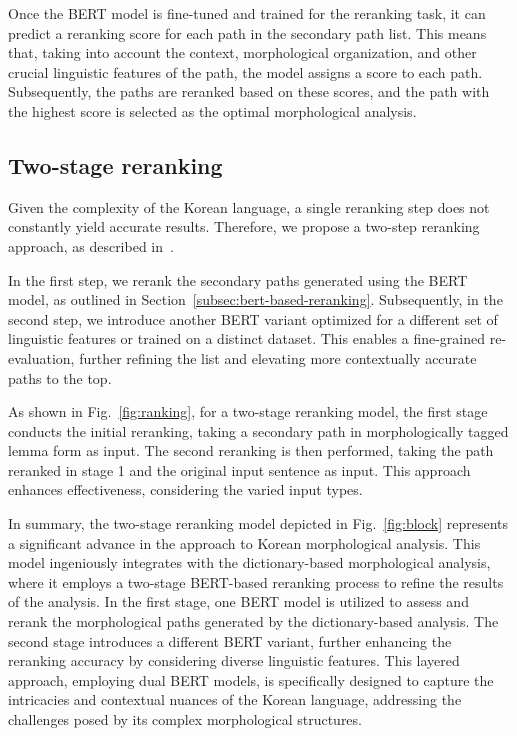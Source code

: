\documentclass[AMS,STIX2COL]{WileyNJD-v2}
\begin{document}
    Once the BERT model is fine-tuned and trained for the reranking task, it can predict a reranking score for each path in the secondary path list.
    This means that, taking into account the context, morphological organization, and other crucial linguistic features of the path, the model assigns a score to each path.
    Subsequently, the paths are reranked based on these scores, and the path with the highest score is selected as the optimal morphological analysis.

    \subsection{Two-stage reranking}\label{subsec:two-stage-reranking}

    Given the complexity of the Korean language, a single reranking step does not constantly yield accurate results.
    Therefore, we propose a two-step reranking approach, as described in~\cite{Nogueira2019}.

    In the first step, we rerank the secondary paths generated using the BERT model, as outlined in Section~\ref{subsec:bert-based-reranking}.
    Subsequently, in the second step, we introduce another BERT variant optimized for a different set of linguistic features or trained on a distinct dataset.
    This enables a fine-grained re-evaluation, further refining the list and elevating more contextually accurate paths to the top.

    As shown in Fig.~\ref{fig:ranking}, for a two-stage reranking model, the first stage conducts the initial reranking, taking a secondary path in morphologically tagged lemma form as input.
    The second reranking is then performed, taking the path reranked in stage 1 and the original input sentence as input.
    This approach enhances effectiveness, considering the varied input types.

    In summary, the two-stage reranking model depicted in Fig.~\ref{fig:block} represents a significant advance in the approach to Korean morphological analysis.
    This model ingeniously integrates with the dictionary-based morphological analysis, where it employs a two-stage BERT-based reranking process to refine the results of the analysis.
    In the first stage, one BERT model is utilized to assess and rerank the morphological paths generated by the dictionary-based analysis.
    The second stage introduces a different BERT variant, further enhancing the reranking accuracy by considering diverse linguistic features.
    This layered approach, employing dual BERT models, is specifically designed to capture the intricacies and contextual nuances of the Korean language, addressing the challenges posed by its complex morphological structures.
\end{document}
